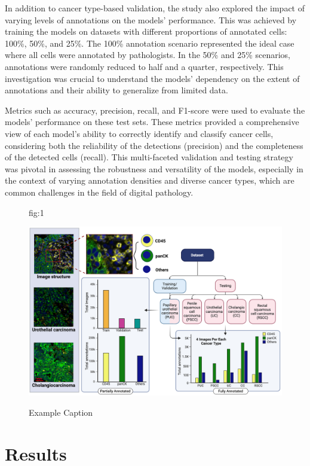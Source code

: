 \documentclass[anon]{midl} %
\begin{document}
In addition to cancer type-based validation, the study also explored the impact of varying levels of annotations on the models' performance. This was achieved by training the models on datasets with different proportions of annotated cells: 100\%, 50\%, and 25\%. The 100\% annotation scenario represented the ideal case where all cells were annotated by pathologists. In the 50\% and 25\% scenarios, annotations were randomly reduced to half and a quarter, respectively. This investigation was crucial to understand the models' dependency on the extent of annotations and their ability to generalize from limited data.

Metrics such as accuracy, precision, recall, and F1-score were used to evaluate the models' performance on these test sets. These metrics provided a comprehensive view of each model's ability to correctly identify and classify cancer cells, considering both the reliability of the detections (precision) and the completeness of the detected cells (recall). This multi-faceted validation and testing strategy was pivotal in assessing the robustness and versatility of the models, especially in the context of varying annotation densities and diverse cancer types, which are common challenges in the field of digital pathology.



\begin{figure}[htbp]
\floatconts
  {fig:1}
  {\caption{Example Caption}}
  {\includegraphics[width=0.90\linewidth]{images/2.png}}
\end{figure}

\section{Results}
\end{document}
